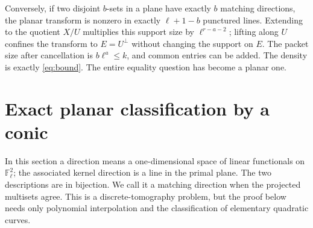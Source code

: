 \documentclass[11pt]{article}
\theoremstyle{remark}\newtheorem{remark}[theorem]{Remark}
\newcommand{\F}{\mathbb F}
\begin{document}
Conversely, if two disjoint $b$-sets in a plane have exactly $b$ matching directions, the planar transform is nonzero in exactly $\ell+1-b$ punctured lines. Extending to the quotient $X/U$ multiplies this support size by $\ell^{r-a-2}$; lifting along $U$ confines the transform to $E=U^\perp$ without changing the support on $E$. The packet size after cancellation is $b\ell^a\le k$, and common entries can be added. The density is exactly \eqref{eq:bound}. The entire equality question has become a planar one.

\section{Exact planar classification by a conic}
In this section a direction means a one-dimensional space of linear functionals on $\F_\ell^2$; the associated kernel direction is a line in the primal plane. The two descriptions are in bijection. We call it a matching direction when the projected multisets agree. This is a discrete-tomography problem, but the proof below needs only polynomial interpolation and the classification of elementary quadratic curves.
\end{document}
